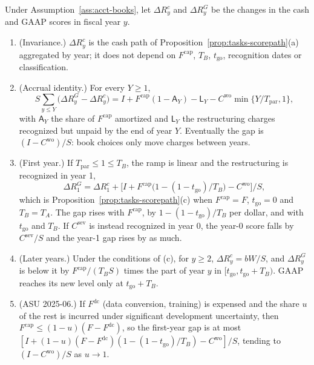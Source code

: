 \begin{proposition}\label{prop:acct-path}
Under Assumption~\ref{ass:acct-books}, let $\Delta R^c_y$ and $\Delta R^G_y$ be the changes in the cash and GAAP scores in fiscal year $y$.
\begin{enumerate}
\item[(a)] (Invariance.) $\Delta R^c_y$ is the cash path of Proposition~\ref{prop:tasks-scorepath}(a) aggregated by year; it does not depend on $F^{\mathrm{cap}}$, $T_B$, $t_{\mathrm{go}}$, recognition dates or classification.
\item[(b)] (Accrual identity.) For every $Y\ge 1$,
\begin{equation}\label{eq:acct-accrual}
S\sum_{y\le Y}\bigl(\Delta R^G_y-\Delta R^c_y\bigr)=I+F^{\mathrm{cap}}(1-\mathsf A_Y)-\mathsf L_Y-C^{\mathrm{wo}}\min\{Y/T_{\mathrm{par}},1\},
\end{equation}
with $\mathsf A_Y$ the share of $F^{\mathrm{cap}}$ amortized and $\mathsf L_Y$ the restructuring charges recognized but unpaid by the end of year $Y$. Eventually the gap is $(I-C^{\mathrm{wo}})/S$: book choices only move charges between years.
\item[(c)] (First year.) If $T_{\mathrm{par}}\le 1\le T_B$, the ramp is linear and the restructuring is recognized in year 1,
\begin{equation}\label{eq:acct-first}
\Delta R^G_1=\Delta R^c_1+\bigl[I+F^{\mathrm{cap}}\bigl(1-(1-t_{\mathrm{go}})/T_B\bigr)-C^{\mathrm{wo}}\bigr]/S ,
\end{equation}
which is Proposition~\ref{prop:tasks-scorepath}(c) when $F^{\mathrm{cap}}=F$, $t_{\mathrm{go}}=0$ and $T_B=T_A$. The gap rises with $F^{\mathrm{cap}}$, by $1-(1-t_{\mathrm{go}})/T_B$ per dollar, and with $t_{\mathrm{go}}$ and $T_B$. If $C^{\mathrm{sev}}$ is instead recognized in year 0, the year-0 score falls by $C^{\mathrm{sev}}/S$ and the year-1 gap rises by as much.
\item[(d)] (Later years.) Under the conditions of (c), for $y\ge 2$, $\Delta R^c_y=bW/S$, and $\Delta R^G_y$ is below it by $F^{\mathrm{cap}}/(T_BS)$ times the part of year $y$ in $[t_{\mathrm{go}},t_{\mathrm{go}}+T_B)$. GAAP reaches its new level only at $t_{\mathrm{go}}+T_B$.
\item[(e)] (ASU 2025-06.) If $F^{\mathrm{dc}}$ (data conversion, training) is expensed and the share $u$ of the rest is incurred under significant development uncertainty, then $F^{\mathrm{cap}}\le(1-u)(F-F^{\mathrm{dc}})$, so the first-year gap is at most $[I+(1-u)(F-F^{\mathrm{dc}})(1-(1-t_{\mathrm{go}})/T_B)-C^{\mathrm{wo}}]/S$, tending to $(I-C^{\mathrm{wo}})/S$ as $u\to 1$.
\end{enumerate}
\end{proposition}

